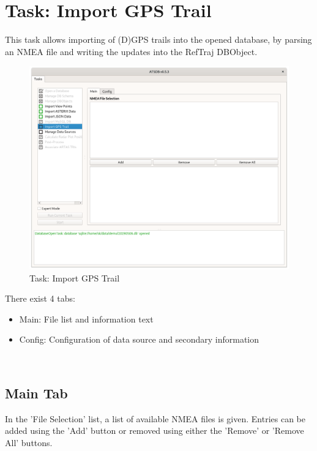 \section{Task: Import GPS Trail}
\label{sec:task_import_gps} 

This task allows importing of (D)GPS trails into the opened database, by parsing an NMEA file and writing the updates into the RefTraj DBObject.

\begin{figure}[H]
  \hspace*{-2.5cm}
    \includegraphics[width=19cm]{../screenshots/gps_import_task.png}
  \caption{Task: Import GPS Trail}
\end{figure}

There exist 4 tabs:

\begin{itemize}  
\item Main: File list and information text
\item Config: Configuration of data source and secondary information
\end{itemize}
\ \\

\subsection{Main Tab}

In the 'File Selection' list, a list of available NMEA files is given. Entries can be added using the 'Add' button or removed using either the 'Remove' or 'Remove All' buttons. \\

